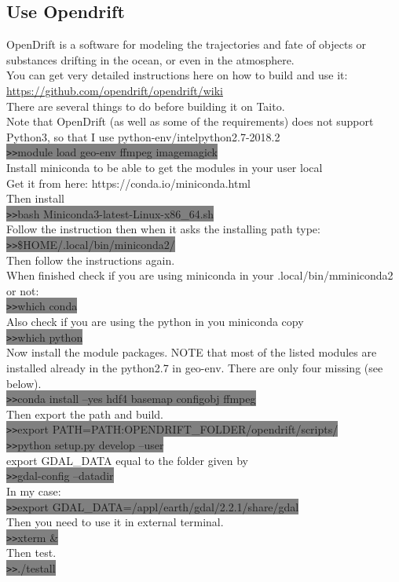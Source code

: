\documentclass[11pt]{article}
\begin{document}
\subsection{Use Opendrift}
OpenDrift is a software for modeling the trajectories and fate of objects or substances drifting in the ocean, or even in the atmosphere.\\
You can get very detailed instructions here on how to build and use it:\\
\url{https://github.com/opendrift/opendrift/wiki}\\
There are several things to do before building it on Taito.\\
Note that OpenDrift (as well as some of the requirements) does not support Python3, so that I use python-env/intelpython2.7-2018.2\\
\colorbox{Grey}{\texttt{>>}module load geo-env ffmpeg imagemagick}\\
Install miniconda to be able to get the modules in your user local\\
Get it from here:
https://conda.io/miniconda.html\\
Then install \\
\colorbox{Grey}{\texttt{>>}bash Miniconda3-latest-Linux-x86\_64.sh}\\
Follow the instruction then when it asks the installing path type:\\
\colorbox{Grey}{\texttt{>>}\$HOME/.local/bin/miniconda2/}\\
Then follow the instructions again.\\
When finished check if you are using miniconda in your .local/bin/mminiconda2 or not:\\
\colorbox{Grey}{\texttt{>>}which conda}\\
Also check if you are using the python in you miniconda copy\\
\colorbox{Grey}{\texttt{>>}which python}\\
Now install the module packages. NOTE that most of the listed modules are installed already in the python2.7 in geo-env. There are only four missing (see below).\\ 
\colorbox{Grey}{\texttt{>>}conda install --yes hdf4 basemap configobj ffmpeg}\\
Then export the path and build.\\
\colorbox{Grey}{\texttt{>>}export PATH=\textdollar PATH:\textdollar OPENDRIFT\_FOLDER/opendrift/scripts/}\\
\colorbox{Grey}{\texttt{>>}python setup.py develop --user}\\
export GDAL\_DATA equal to the folder given by\\
\colorbox{Grey}{\texttt{>>}gdal-config --datadir}\\
In my case: \\
\colorbox{Grey}{\texttt{>>}export GDAL\_DATA=/appl/earth/gdal/2.2.1/share/gdal}\\
Then you need to use it in external terminal.\\
\colorbox{Grey}{\texttt{>>}xterm \&}\\
Then test.\\
\colorbox{Grey}{\texttt{>>}./testall}\\
\end{document}
